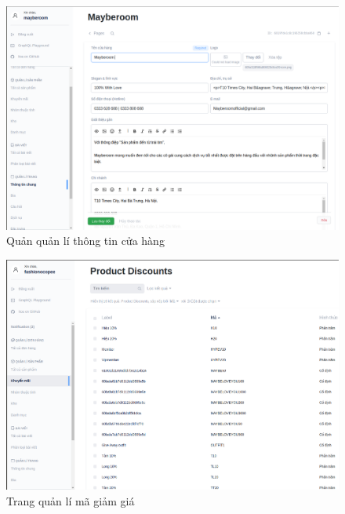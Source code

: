 \begin{figure}[!htbp]
	\begin{center}	
		\includegraphics[width=\textwidth]{./results/store}
		\caption{Quản quản lí thông tin cửa hàng}
	\end{center}
\end{figure}
\clearpage
\FloatBarrier
\begin{figure}[!htbp]
	\begin{center}	
		\includegraphics[width=\textwidth]{./results/discount}
		\caption{Trang quản lí mã giảm giá}
	\end{center}
\end{figure}
\clearpage
\FloatBarrier

